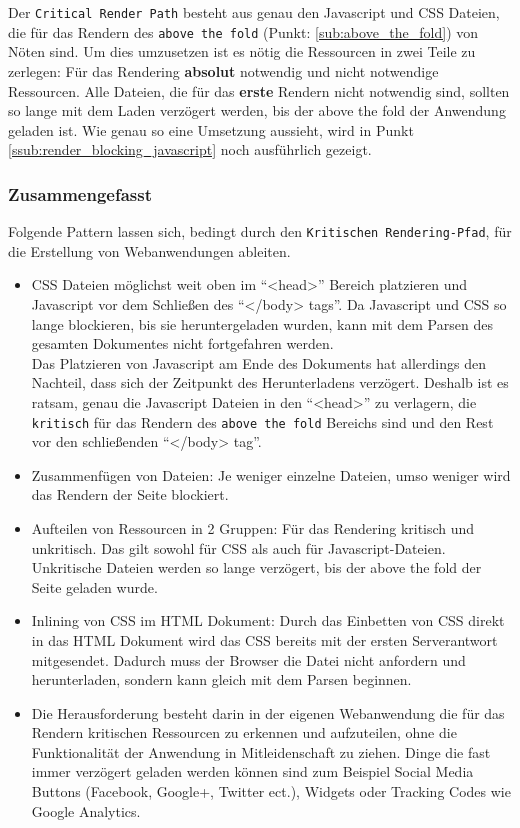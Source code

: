 			Der \texttt{Critical Render Path} besteht aus genau den Javascript und CSS Dateien, die für das Rendern des \texttt{above the fold} (Punkt: \ref{sub:above_the_fold}) von Nöten sind. Um dies umzusetzen ist es nötig die Ressourcen in zwei Teile zu zerlegen: Für das Rendering \textbf{absolut} notwendig und nicht notwendige Ressourcen. Alle Dateien, die für das \textbf{erste} Rendern nicht notwendig sind, sollten so lange mit dem Laden verzögert werden, bis der above the fold der Anwendung geladen ist. Wie genau so eine Umsetzung aussieht, wird in Punkt \ref{ssub:render_blocking_javascript} noch ausführlich gezeigt.


		\subsubsection{Zusammengefasst} %
		\label{ssub:zusammengefasst_render_path}
		  Folgende Pattern lassen sich, bedingt durch den \texttt{Kritischen Rendering-Pfad}, für die Erstellung von Webanwendungen ableiten.

			\begin{itemize}
				\item CSS Dateien möglichst weit oben im "`<head>"' Bereich platzieren und Javascript vor dem Schließen des "`</body> tags"'. Da Javascript und CSS so lange blockieren, bis sie heruntergeladen wurden, kann mit dem Parsen des gesamten Dokumentes nicht fortgefahren werden. \autocite{placingScripts}\\
				Das Platzieren von Javascript am Ende des Dokuments hat allerdings den Nachteil, dass sich der Zeitpunkt des Herunterladens verzögert. Deshalb ist es ratsam, genau die Javascript Dateien in den "`<head>"' zu verlagern, die \texttt{kritisch} für das Rendern des \texttt{above the fold} Bereichs sind und den Rest vor den schließenden "`</body> tag"'. 

				\item Zusammenfügen von Dateien: Je weniger einzelne Dateien, umso weniger wird das Rendern der Seite blockiert.

				\item Aufteilen von Ressourcen in 2 Gruppen: Für das Rendering kritisch und unkritisch. Das gilt sowohl für CSS als auch für Javascript-Dateien. Unkritische Dateien werden so lange verzögert, bis der above the fold der Seite geladen wurde.

				\item Inlining von CSS im HTML Dokument: Durch das Einbetten von CSS direkt in das HTML Dokument wird das CSS bereits mit der ersten Serverantwort mitgesendet. Dadurch muss der Browser die Datei nicht anfordern und herunterladen, sondern kann gleich mit dem Parsen beginnen.

				\item Die Herausforderung besteht darin in der eigenen Webanwendung die für das Rendern kritischen Ressourcen zu erkennen und aufzuteilen, ohne die Funktionalität der Anwendung in Mitleidenschaft zu ziehen. Dinge die fast immer verzögert geladen werden können sind zum Beispiel Social Media Buttons (Facebook, Google+, Twitter ect.), Widgets oder Tracking Codes wie Google Analytics.
			\end{itemize}

